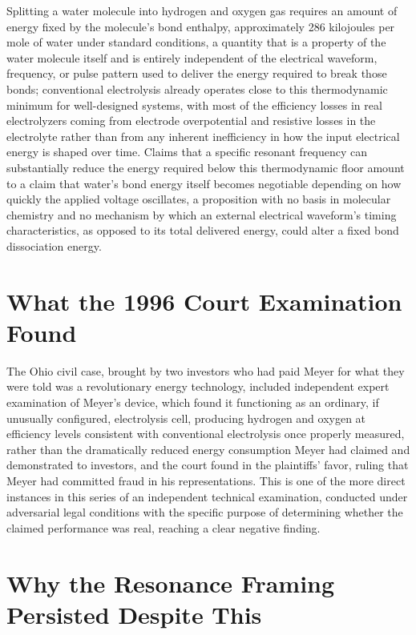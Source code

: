 \documentclass[11pt]{article}
\begin{document}
Splitting a water molecule into hydrogen and oxygen gas requires an amount of energy fixed by the molecule's bond enthalpy, approximately 286 kilojoules per mole of water under standard conditions, a quantity that is a property of the water molecule itself and is entirely independent of the electrical waveform, frequency, or pulse pattern used to deliver the energy required to break those bonds; conventional electrolysis already operates close to this thermodynamic minimum for well-designed systems, with most of the efficiency losses in real electrolyzers coming from electrode overpotential and resistive losses in the electrolyte rather than from any inherent inefficiency in how the input electrical energy is shaped over time. Claims that a specific resonant frequency can substantially reduce the energy required below this thermodynamic floor amount to a claim that water's bond energy itself becomes negotiable depending on how quickly the applied voltage oscillates, a proposition with no basis in molecular chemistry and no mechanism by which an external electrical waveform's timing characteristics, as opposed to its total delivered energy, could alter a fixed bond dissociation energy.

\section{What the 1996 Court Examination Found}

The Ohio civil case, brought by two investors who had paid Meyer for what they were told was a revolutionary energy technology, included independent expert examination of Meyer's device, which found it functioning as an ordinary, if unusually configured, electrolysis cell, producing hydrogen and oxygen at efficiency levels consistent with conventional electrolysis once properly measured, rather than the dramatically reduced energy consumption Meyer had claimed and demonstrated to investors, and the court found in the plaintiffs' favor, ruling that Meyer had committed fraud in his representations. This is one of the more direct instances in this series of an independent technical examination, conducted under adversarial legal conditions with the specific purpose of determining whether the claimed performance was real, reaching a clear negative finding.

\section{Why the Resonance Framing Persisted Despite This}
\end{document}
